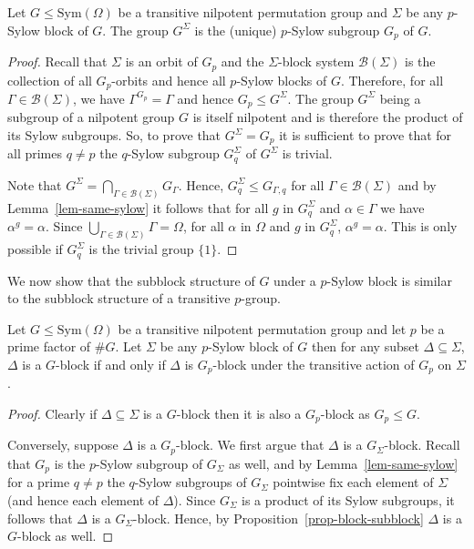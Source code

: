 \documentclass[prodmod,acmtalg]{acmsmall}
\newcommand{\Blocks}[1]{{\ensuremath{\mathcal{B}\left(#1\right)}}}
\newcommand{\Sym}[1]{{\ensuremath{\mathrm{Sym}\left(#1\right)}}}
\begin{document}
\begin{lemma}\label{lem-gsup-sylow}
  Let $G\leq\Sym{\Omega}$ be a transitive nilpotent permutation group
  and $\Sigma$ be any $p$-Sylow block of $G$. The group $G^{\Sigma}$
  is the (unique) $p$-Sylow subgroup $G_p$ of $G$.
\end{lemma}
\begin{proof}
  Recall that $\Sigma$ is an orbit of $G_p$ and the $\Sigma$-block
  system $\Blocks{\Sigma}$ is the collection of all $G_p$-orbits and
  hence all $p$-Sylow blocks of $G$. Therefore, for all $\Gamma \in
  \Blocks{\Sigma}$, we have $\Gamma^{G_p} = \Gamma$ and hence $G_p
  \leq G^{\Sigma}$. The group $G^\Sigma$ being a subgroup of a
  nilpotent group $G$ is itself nilpotent and is therefore the product
  of its Sylow subgroups. So, to prove that $G^\Sigma = G_p$ it is
  sufficient to prove that for all primes $q\neq p$ the $q$-Sylow
  subgroup $G^\Sigma_q$ of $G^{\Sigma}$ is trivial.

  Note that $G^\Sigma=\bigcap_{\Gamma \in \Blocks{\Sigma}}
  G_\Gamma$. Hence, $G^\Sigma_q \leq G_{\Gamma,q}$ for all $\Gamma \in
  \Blocks{\Sigma}$ and by Lemma~\ref{lem-same-sylow} it follows that
  for all $g$ in $G^\Sigma_q$ and $\alpha\in\Gamma$ we have
  $\alpha^g=\alpha$. Since $\bigcup_{\Gamma\in \Blocks{\Sigma}} \Gamma
  = \Omega$, for all $\alpha$ in $\Omega$ and $g$ in $G^\Sigma_q$,
  $\alpha^g=\alpha$. This is only possible if $G^\Sigma_q$ is the
  trivial group $\{1\}$.
\end{proof}

We now show that the subblock structure of $G$ under a $p$-Sylow block
is similar to the subblock structure of a transitive $p$-group.


\begin{lemma}\label{lem-sylow-subblocks}
  Let $G\leq\Sym{\Omega}$ be a transitive nilpotent permutation group
  and let $p$ be a prime factor of $\# G$. Let $\Sigma$ be any
  $p$-Sylow block of $G$ then for any subset $\Delta \subseteq
  \Sigma$, $\Delta$ is a $G$-block if and only if $\Delta$ is
  $G_p$-block under the transitive action of $G_p$ on $\Sigma$.
\end{lemma}
\begin{proof}
  Clearly if $\Delta \subseteq \Sigma$ is a $G$-block then it is also
  a $G_p$-block as $G_p \leq G$.

  Conversely, suppose $\Delta$ is a $G_p$-block. We first argue that
  $\Delta$ is a $G_\Sigma$-block. Recall that $G_p$ is the $p$-Sylow
  subgroup of $G_\Sigma$ as well, and by Lemma~\ref{lem-same-sylow}
  for a prime $q\neq p$ the $q$-Sylow subgroups of $G_\Sigma$
  pointwise fix each element of $\Sigma$ (and hence each element of
  $\Delta$). Since $G_\Sigma$ is a product of its Sylow subgroups, it
  follows that $\Delta$ is a $G_\Sigma$-block.  Hence, by
  Proposition~\ref{prop-block-subblock} $\Delta$ is a $G$-block as
  well.
\end{proof}
\end{document}
